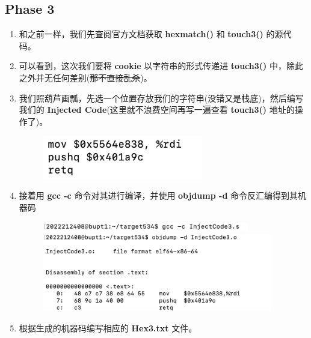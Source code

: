     \subsection{Phase 3}
        \begin{enumerate}
            \item 和之前一样，我们先查阅官方文档获取 \textbf{hexmatch()} 和 \textbf{touch3()} 的源代码。
                
            \item 可以看到，这次我们要将 \textbf{cookie} 以字符串的形式传递进 \textbf{touch3()} 中，除此之外并无任何差别(\sout{那不直接乱杀})。
            \item 我们照葫芦画瓢，先选一个位置存放我们的字符串(没错又是栈底)，然后编写我们的 \textbf{Injected Code}(这里就不浪费空间再写一遍查看 \textbf{touch3()} 地址的操作了)。
                \begin{figure}[htbp]
                    \hspace*{1.5cm}
                    \includegraphics*[width = 7cm]{s3_0.png}
                \end{figure}
            \item 接着用 \textbf{gcc -c} 命令对其进行编译，并使用 \textbf{objdump -d} 命令反汇编得到其机器码
                \begin{figure}[htbp]
                    \hspace*{1.5cm}
                    \includegraphics*[width = 9cm]{s3_1.png} \\
                    \hspace*{1.5cm}
                    \includegraphics*[width = 10cm]{s3_2.png}
                \end{figure}
            \newpage
            \item 根据生成的机器码编写相应的 \textbf{Hex3.txt} 文件。

\end{enumerate}
